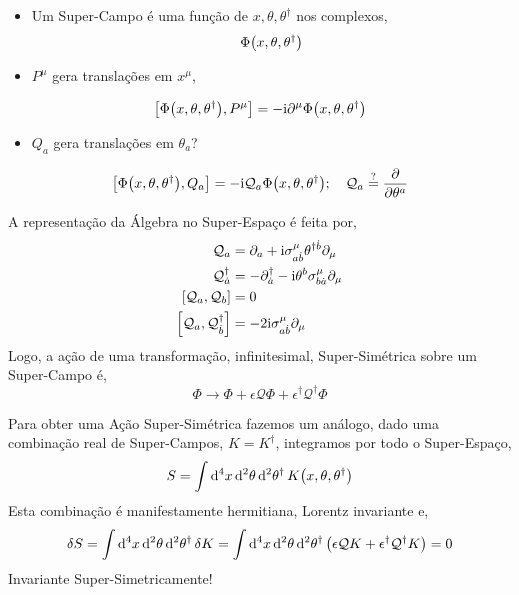 \documentclass{beamer}
\begin{document}
\begin{frame}
    \begin{itemize}
        \item Um Super-Campo é uma função de $x,\theta,\theta^\dagger$ nos complexos,
        \[\Phi\qty(x,\theta,\theta^\dagger)\]
    \end{itemize}\pause
    \begin{itemize}
        \item $P^\mu$ gera translações em $x^\mu$,
    \end{itemize}
    \[\comm{\Phi\qty(x,\theta,\theta^\dagger)}{P^\mu}=-\im \partial^\mu\Phi\qty(x,\theta,\theta^\dagger)\]\pause
    \begin{itemize}
        \item $Q_a$ gera translações em $\theta_a$?
    \end{itemize}
    \[\comm{\Phi\qty(x,\theta,\theta^\dagger)}{Q_a}=-\im\mathcal Q_a\Phi\qty(x,\theta,\theta^\dagger);\ \ \ \mathcal Q_a\stackrel{?}{=}\pdv{}{\theta^a}\]
\end{frame}

\begin{frame}
    A representação da Álgebra no Super-Espaço é feita por,
    \begin{align*}
        {\mathcal {Q}}_a&=\partial_a+\im\sigma^\mu_{a\dot b}\theta^{\dagger\dot b}\partial_\mu\\
        {\mathcal {Q}}^\dagger_{\dot a}&=-\partial^\dagger_{\dot a}-\im\theta^b\sigma^\mu_{b\dot a}\partial_\mu\\
        \comm{\mathcal Q_a}{\mathcal Q_b}&=0\\
        \comm{\mathcal Q_a}{\mathcal Q^\dagger_{\dot b}}&=-2\im\sigma^\mu_{a\dot b}\partial_\mu
    \end{align*}
    Logo, a ação de uma transformação, infinitesimal, Super-Simétrica sobre um Super-Campo é,
    \[\Phi\rightarrow\Phi+\epsilon\mathcal Q\Phi+\epsilon^\dagger\mathcal Q^\dagger\Phi\]
\end{frame}

\begin{frame}
    Para obter uma Ação Super-Simétrica fazemos um análogo, dado uma combinação real de Super-Campos, $K=K^\dagger$, 
    integramos por todo o Super-Espaço,
    \begin{align*}
        S=\int\dd[4]{x}\dd[2]{\theta}\dd[2]{\theta^\dagger}K\qty(x,\theta,\theta^\dagger)
    \end{align*}
    Esta combinação é manifestamente hermitiana, Lorentz invariante e,
    \[\delta S=\int\dd[4]{x}\dd[2]{\theta}\dd[2]{\theta^\dagger}\delta K=\int\dd[4]{x}\dd[2]{\theta}\dd[2]{\theta^\dagger}\qty(\epsilon\mathcal Q K+\epsilon^\dagger\mathcal Q^\dagger K)=0\]
    Invariante Super-Simetricamente!
\end{frame}
\end{document}
